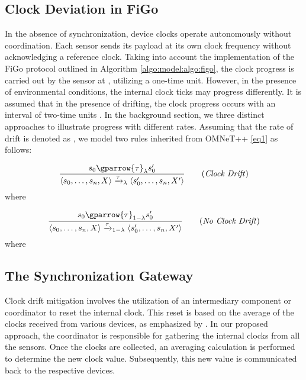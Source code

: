 \subsection{Clock Deviation in FiGo}
In the absence of synchronization, device clocks operate autonomously without coordination. Each sensor sends its payload at its own clock frequency without acknowledging a reference clock. Taking into account the implementation of the FiGo protocol outlined in Algorithm \ref{algo:model:algo:figo}, the clock progress is carried out by the sensor at , utilizing a one-time unit. However, in the presence of environmental conditions, the internal clock ticks may progress differently. It is assumed that in the presence of drifting, the clock progress occurs with an interval of two-time units \cite{WEBSTER2020101183}. In the background section, we  three distinct approaches to illustrate progress with different rates. Assuming that the rate of drift is denoted as \emath{\lambda}, we model two rules inherited from OMNeT++ \ref{eq1} as follows:

\noindent

\begin{boxD}

   \begin{equation}\frac{ s_{0} \gparrow{\tau}_{\lambda} s'_{0}} { \langle s_{0},\ldots,s_{n},X\rangle \xrightarrow{\tau}_{\lambda}\langle s'_{0},\ldots,s_{n},X'\rangle  } \label{eqc1} \tag{\emph{Clock Drift}} 
   \end{equation}
      where   

         \begin{equation}\frac{ s_{0} \gparrow{\tau}_{1-\lambda} s'_{0}} { \langle s_{0},\ldots,s_{n},X\rangle \xrightarrow{\tau}_{1-\lambda}\langle s'_{0},\ldots,s_{n},X'\rangle  } \label{eqc2} \tag{\emph{No Clock Drift}} 
   \end{equation}
      where   
	     
\end{boxD}


\subsection{The Synchronization Gateway}
Clock drift mitigation involves the utilization of an intermediary component or coordinator to reset the internal clock. This reset is based on the average of the clocks received from various devices, as emphasized by \cite{WebsterBDFM18}. In our proposed approach, the coordinator is responsible for gathering the internal clocks from all the sensors. Once the clocks are collected, an averaging calculation is performed to determine the new clock value. Subsequently, this new value is communicated back to the respective devices.


